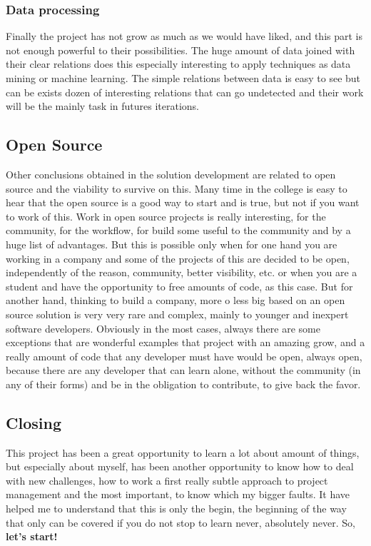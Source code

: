 \subsubsection{Data processing}

Finally the project has not grow as much as we would have liked, and this part
is not enough powerful to their possibilities. The huge amount of data joined
with their clear relations does this especially interesting to apply techniques
as data mining or machine learning. The simple relations between data is easy
to see but can be exists dozen of interesting relations that can go undetected
and their work will be the mainly task in futures iterations.

\subsection{Open Source}

Other conclusions obtained in the solution development are related to open source and the
viability to survive on this. Many time in the college is easy to hear that the
open source is a good way to start and is true, but not if you want to work of
this. Work in open source projects is really interesting, for the community,
for the workflow, for build some useful to the community and by a huge list of
advantages. But this is possible only when for one hand you are working in a
company and some of the projects of this are decided to be open, independently of the
reason, community, better visibility, etc. or when you are a student and have
the opportunity to free amounts of code, as this case. But for another hand,
thinking to build a company, more o less big based on an open source solution
is very very rare and complex, mainly to younger and inexpert software developers.
\intro
Obviously in the most cases, always there are some exceptions that are
wonderful examples that project with an amazing grow, and a really amount of
code that any developer must have would be open, always open, because there
are any developer that can learn alone, without the community (in any of their
forms) and be in the obligation to contribute, to give back the favor.

\subsection{Closing}
This project has been a great opportunity to learn a lot about amount of things,
but especially about myself, has been another opportunity to know how to deal with
new challenges, how to work a first really subtle approach to project management and
the most important, to know which my bigger faults.
It have helped me to understand that this is only the begin, the beginning of
the way that only can be covered if you do not stop to learn never, absolutely never.
\intro
So, \textbf{let's start!}
